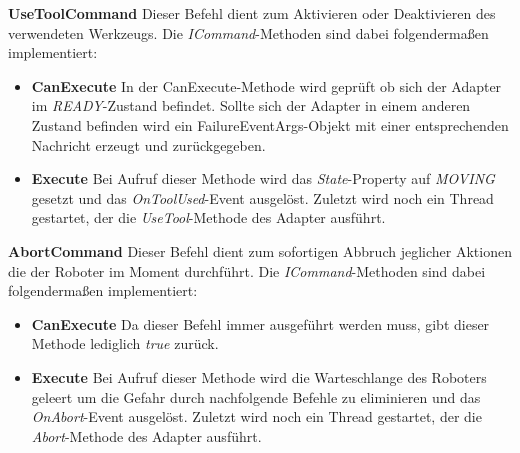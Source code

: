 \textbf{UseToolCommand}
\newline
Dieser Befehl dient zum Aktivieren oder Deaktivieren des verwendeten Werkzeugs. Die \textit{ICommand}-Methoden sind dabei folgendermaßen implementiert:
\begin{itemize}
\item \textbf{CanExecute}
\newline
In der CanExecute-Methode wird geprüft ob sich der Adapter im \textit{READY}-Zustand befindet. Sollte sich der Adapter in einem anderen Zustand befinden wird ein FailureEventArgs-Objekt mit einer entsprechenden Nachricht erzeugt und zurückgegeben.
\item \textbf{Execute}
\newline
Bei Aufruf dieser Methode wird das \textit{State}-Property auf \textit{MOVING} gesetzt und das \textit{OnToolUsed}-Event ausgelöst. Zuletzt wird noch ein Thread gestartet, der die \textit{UseTool}-Methode des Adapter ausführt. 
\end{itemize}
\newpage
\textbf{AbortCommand}
\newline
Dieser Befehl dient zum sofortigen Abbruch jeglicher Aktionen die der Roboter im Moment durchführt. Die \textit{ICommand}-Methoden sind dabei folgendermaßen implementiert:
\begin{itemize}
\item \textbf{CanExecute}
\newline
Da dieser Befehl immer ausgeführt werden muss, gibt dieser Methode lediglich \textit{true} zurück.
\item \textbf{Execute}
\newline
Bei Aufruf dieser Methode wird die Warteschlange des Roboters geleert um die Gefahr durch nachfolgende Befehle zu eliminieren und das \textit{OnAbort}-Event ausgelöst. Zuletzt wird noch ein Thread gestartet, der die \textit{Abort}-Methode des Adapter ausführt. 
\end{itemize}